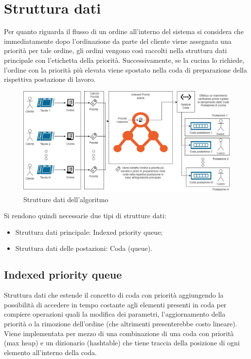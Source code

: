 \section{Struttura dati}
Per quanto riguarda il flusso di un ordine all’interno del sistema si considera che immediatamente dopo l’ordinazione da parte del cliente viene assegnata una priorità per tale ordine, gli ordini vengono così raccolti nella struttura dati principale con l’etichetta della priorità. Successivamente, se la cucina lo richiede, l'ordine con la priorità più elevata viene spostato nella coda di preparazione della rispettiva postazione di lavoro.


\begin{figure}[htbp]
	\centering
	\includegraphics[scale=0.4]{iterazione2/images/Algoritmo_struttura.jpg}
	\caption{Strutture dati dell'algoritmo\label{fig:algoritmo_struttura}}
\end{figure}

Si rendono quindi necessarie due tipi di strutture dati:
\begin{itemize}
	\item Struttura dati principale: Indexed priority queue\cite{geeksforgeeks};
	\item Struttura dati delle postazioni: Coda (queue).
\end{itemize}

\subsection{Indexed priority queue}
Struttura dati che estende il concetto di coda con priorità aggiungendo la possibilità di accedere in tempo costante agli elementi presenti in coda per compiere operazioni quali la modifica dei parametri, l’aggiornamento della priorità o la rimozione dell’ordine (che altrimenti presenterebbe costo lineare).
Viene implementata per mezzo di una combinazione di una coda con priorità (max heap) e un dizionario (hashtable) che tiene traccia della posizione di ogni elemento all'interno della coda.

